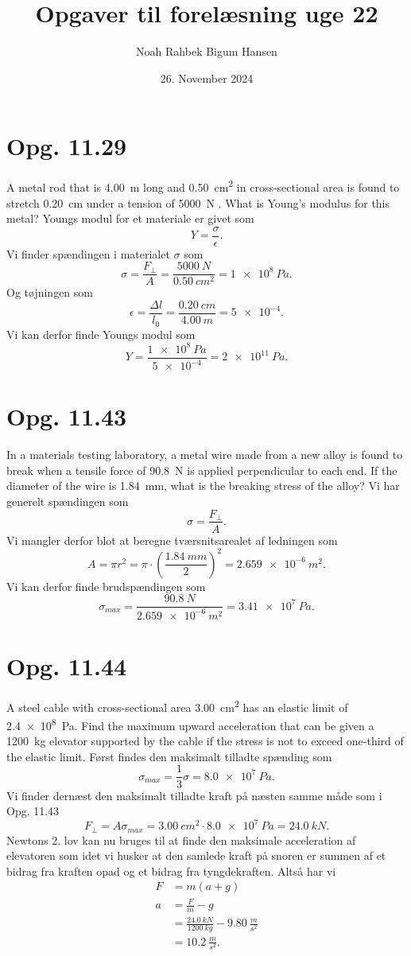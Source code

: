 \documentclass[12pt]{article}
\title{Opgaver til forelæsning uge 22}
\author{Noah Rahbek Bigum Hansen}
\date{26. November 2024}
\theoremstyle{definition}
\begin{document}
\maketitle

\section*{Opg. 11.29}
A metal rod that is \qty{4,00}{m} long and \qty{0,50}{cm^2} in cross-sectional area is found to stretch \qty{0,20}{cm} under a tension of \qty{5000}{N} . What is Young’s modulus for this metal?
\bigbreak
Youngs modul for et materiale er givet som
\[ 
Y = \frac{\sigma}{\epsilon}
.\]
Vi finder spændingen i materialet $\sigma$ som
\[ 
  \sigma = \frac{F_{\perp}}{A} = \frac{\qty{5000}{N}}{\qty{0,50}{cm^2}} = \qty{1e8}{Pa} 
.\]
Og tøjningen som
\[ 
  \epsilon = \frac{\Delta l}{l_0} = \frac{\qty{0,20}{cm}}{\qty{4,00}{m}} = \num{5e-4} 
.\]
Vi kan derfor finde Youngs modul som
\[ 
  Y = \frac{\qty{1e8}{Pa}}{\num{5e-4}} = \qty{2e11}{Pa} 
.\]



\section*{Opg. 11.43}
In a materials testing laboratory, a metal wire made from a new alloy is found to break when a tensile force of \qty{90,8}{N} is applied perpendicular to each end. If the diameter of the wire is \qty{1,84}{mm}, what is the breaking stress of the alloy?
\bigbreak
Vi har generelt spændingen som
\[ 
  \sigma = \frac{F_{\perp}}{A}
.\]
Vi mangler derfor blot at beregne tværsnitsarealet af ledningen som
\[ 
  A = \pi r^2 = \pi \cdot \left( \frac{\qty{1,84}{mm}}{2} \right)^2 = \qty{2,659e-6}{m^2} 
.\]
Vi kan derfor finde brudspændingen som
\[ 
  \sigma_{max} = \frac{\qty{90,8}{N}}{\qty{2,659e-6}{m^2}} = \qty{3,41e7}{Pa} 
.\]


\section*{Opg. 11.44}
A steel cable with cross-sectional area \qty{3,00}{cm^2} has an elastic limit of \qty{2,4e8}{Pa}. Find the maximum upward acceleration that can be given a \qty{1200}{kg} elevator supported by the cable if the stress is not to exceed one-third of the elastic limit.
\bigbreak
Først findes den maksimalt tilladte spænding som
\[ 
\sigma_{max} = \frac{1}{3}\sigma = \qty{8.0e7}{Pa} 
.\]
Vi finder dernæst den maksimalt tilladte kraft på næsten samme måde som i Opg. 11.43
\[ 
  F_{\perp} = A\sigma_{max} = \qty{3,00}{cm^2} \cdot \qty{8.0e7}{Pa} = \qty{24,0}{kN} 
.\]
Newtons 2. lov kan nu bruges til at finde den maksimale acceleration af elevatoren som idet vi husker at den samlede kraft på snoren er summen af et bidrag fra kraften opad og et bidrag fra tyngdekraften. Altså har vi
\begin{align*}
  F &= m(a+g) \\
  a &= \frac{F}{m} - g \\
  &= \frac{\qty{24,0}{kN}}{\qty{1200}{kg}} - \qty{9,80}{\frac{m}{s^2}}  \\
  &= \qty{10,2}{\frac{m}{s^2}} 
.\end{align*}
\end{document}
